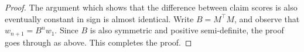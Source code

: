 \begin{proof}
    The argument which shows that the difference between claim scores
    is also eventually constant in sign is almost identical. Write $B =
    M^{\top}M$, and observe that $w_{n+1} = B^nw_1$. Since $B$ is also
    symmetric and positive semi-definite, the proof goes through as above. This
    completes the proof.
\end{proof}
